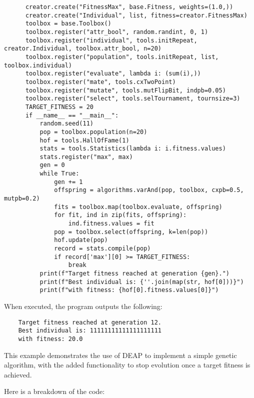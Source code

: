   \begin{src}
    \label{src:sota:deap:example}
    \begin{verbatim}
      creator.create("FitnessMax", base.Fitness, weights=(1.0,))
      creator.create("Individual", list, fitness=creator.FitnessMax)
      toolbox = base.Toolbox()
      toolbox.register("attr_bool", random.randint, 0, 1)
      toolbox.register("individual", tools.initRepeat, creator.Individual, toolbox.attr_bool, n=20)
      toolbox.register("population", tools.initRepeat, list, toolbox.individual)
      toolbox.register("evaluate", lambda i: (sum(i),))
      toolbox.register("mate", tools.cxTwoPoint)
      toolbox.register("mutate", tools.mutFlipBit, indpb=0.05)
      toolbox.register("select", tools.selTournament, tournsize=3)
      TARGET_FITNESS = 20
      if __name__ == "__main__":
          random.seed(11)
          pop = toolbox.population(n=20)
          hof = tools.HallOfFame(1)
          stats = tools.Statistics(lambda i: i.fitness.values)
          stats.register("max", max)
          gen = 0
          while True:
              gen += 1
              offspring = algorithms.varAnd(pop, toolbox, cxpb=0.5, mutpb=0.2)
              fits = toolbox.map(toolbox.evaluate, offspring)
              for fit, ind in zip(fits, offspring):
                  ind.fitness.values = fit
              pop = toolbox.select(offspring, k=len(pop))
              hof.update(pop)
              record = stats.compile(pop)
              if record['max'][0] >= TARGET_FITNESS:
                  break
          print(f"Target fitness reached at generation {gen}.")
          print(f"Best individual is: {''.join(map(str, hof[0]))}")
          print(f"with fitness: {hof[0].fitness.values[0]}")
    \end{verbatim}
  \end{src}

  When executed, the program outputs the following:

  \begin{verbatim}
    Target fitness reached at generation 12.
    Best individual is: 11111111111111111111
    with fitness: 20.0
  \end{verbatim}

  This example demonstrates the use of DEAP to implement a simple genetic
  algorithm, with the added functionality to stop evolution once a target
  fitness is achieved.

  Here is a breakdown of the code:

